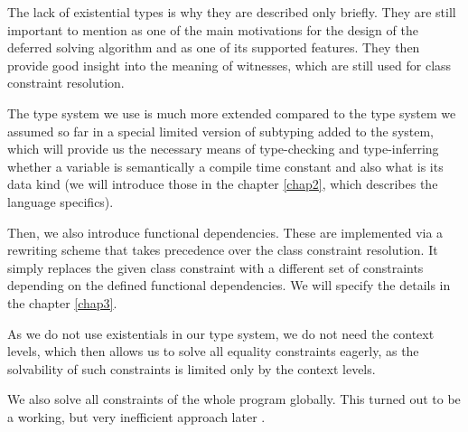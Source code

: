 The lack of existential types is why they are described only briefly. They are still important to mention as one of the main motivations for the design of the deferred solving algorithm and as one of its supported features. They then provide good insight into the meaning of witnesses, which are still used for class constraint resolution.

The type system we use is much more extended compared to the type system we assumed so far in a special limited version of subtyping added to the system, which will provide us the necessary means of type-checking and type-inferring whether a variable is semantically a compile time constant and also what is its data kind (we will introduce those in the chapter \ref{chap2}, which describes the language specifics).

Then, we also introduce functional dependencies. These are implemented via a rewriting scheme that takes precedence over the class constraint resolution. It simply replaces the given class constraint with a different set of constraints depending on the defined functional dependencies. We will specify the details in the chapter \ref{chap3}.

As we do not use existentials in our type system, we do not need the context levels, which then allows us to solve all equality constraints eagerly, as the solvability of such constraints is limited only by the context levels.

We also solve all constraints of the whole program globally. This turned out to be a working, but very inefficient approach later .
